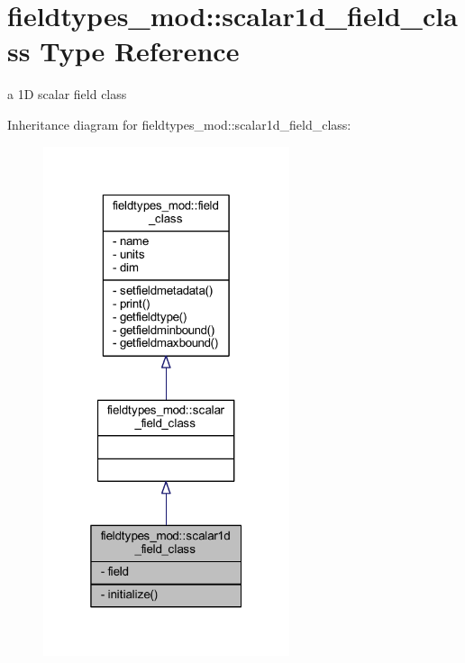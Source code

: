 \hypertarget{structfieldtypes__mod_1_1scalar1d__field__class}{}\section{fieldtypes\+\_\+mod\+:\+:scalar1d\+\_\+field\+\_\+class Type Reference}
\label{structfieldtypes__mod_1_1scalar1d__field__class}


a 1D scalar field class  




Inheritance diagram for fieldtypes\+\_\+mod\+:\+:scalar1d\+\_\+field\+\_\+class\+:\nopagebreak
\begin{figure}[H]
\begin{center}
\leavevmode
\includegraphics[width=205pt]{structfieldtypes__mod_1_1scalar1d__field__class__inherit__graph}
\end{center}
\end{figure}


